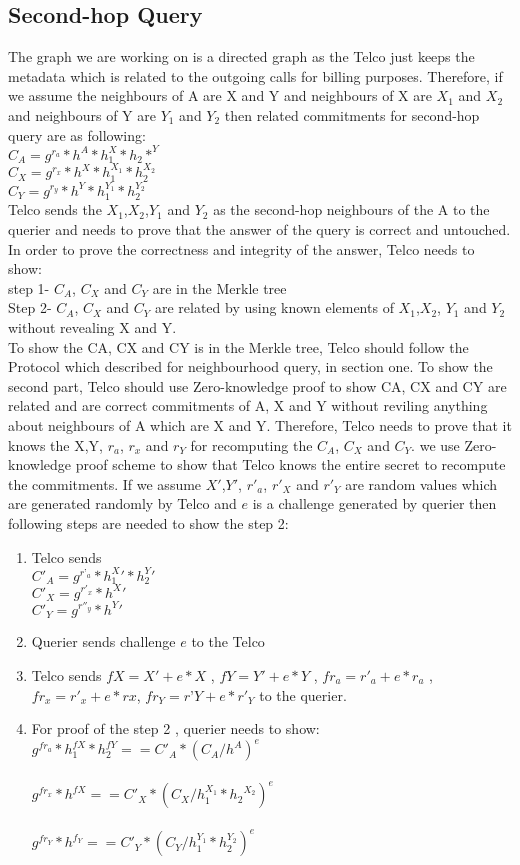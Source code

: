 \documentclass[12pt]{article}
\begin{document}
	\subsection{Second-hop Query }
The graph we are working on is a directed graph as the Telco just keeps the metadata which is related to the outgoing calls for billing purposes. Therefore, if we assume the neighbours of A are X and Y and neighbours of X are $X_1$ and $X_2$ and neighbours of Y are $Y_1$ and $Y_2$ then related commitments for second-hop query are as following:\\
$C_A=g^{r_a}*h^A*h_1^X*h_2*^Y$\\
$C_X=g^{r_x}*h^X*h_1^{X_1}*h_2^{X_2}$\\
$C_Y=g^{r_y}*h^Y*h_1^{Y_1}*h_2^{Y_2}$\\
Telco sends the $X_1$,$X_2$,$Y_1$ and $Y_2$ as the second-hop neighbours of the A to the querier and needs to prove that the answer of the query is correct and untouched. 
In order to prove the correctness and integrity of the answer, Telco needs to show: \\
step 1- $C_A$, $C_X$ and $C_Y$ are in the Merkle tree\\
 Step 2- $C_A$, $C_X$ and $C_Y$ are related by using known elements of $X_1$,$ X_2$, $Y_1$ and $Y_2$ without revealing X and Y.\\
 To show the CA, CX and CY is in the Merkle tree, Telco should follow the Protocol which described for neighbourhood query, in section one. To show the second part, Telco should use Zero-knowledge proof to show CA, CX and CY are related and are correct commitments of A, X and Y without reviling anything about neighbours of A which are X and Y. Therefore, Telco needs to prove that it knows the X,Y, $r_a$, $r_x$ and $r_Y$ for recomputing the $C_A$, $C_X$ and $C_Y$.
 we use Zero-knowledge proof scheme to show that Telco knows the entire secret to recompute the commitments. If we assume $X'$,$Y'$, $r'_a$, $r'_X$ and $r'_Y$ are random values which are generated randomly by Telco and $e$ is a challenge generated  by querier then following steps are needed to show the step 2:\\
 \begin{enumerate}
 \item	Telco sends \\
 $C'_A= g^{r’_a} *h_1^X'*h_2^Y'$\\
  $C'_X =g^{r'_x}*h^X'$\\
  $C'_Y = g^{r''_y}*h^Y'$
  \item	Querier sends challenge $e$ to the Telco
  \item Telco sends $fX=X'+e*X$ , $fY=Y'+e*Y$ , $fr_a=r'_a+e*r_a$ ,$fr_x=r'_x+e*rx$, $fr_Y=r’Y+e*r'_Y$ to the querier.
  \item 	For proof of the step 2 , querier needs to show: \\
 $ g^{fr_a}* h_1^{fX}* h_2^{fY} == C'_A*(C_A/h^A)^e$\\\\
  $g^{fr_x}*h^{fX}== C'_X*(C_X/h_1^{X_1}*{h_2}^{X_2})^e$\\\\
  $g^{fr_Y}*h^{f_Y}==C'_Y*(C_Y/h_1^{Y_1}*h_2^{Y_2})^e$
 \end{enumerate}
 
 
 	
\end{document}
